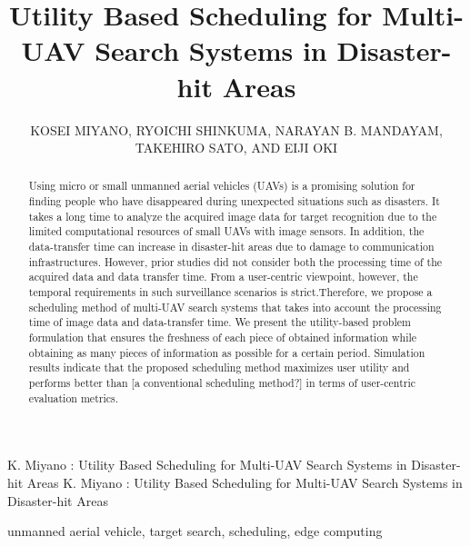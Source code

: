 \documentclass{ieeeaccess}
\begin{document}
\title{Utility Based Scheduling for Multi-UAV Search Systems in Disaster-hit Areas}

\author{\uppercase{Kosei MIYANO, Ryoichi SHINKUMA, NARAYAN B. MANDAYAM, Takehiro SATO, and Eiji OKI}}
\address[1]{Graduate School of Informatics, Kyoto University, Yoshida-honmachi, Sakyo-ku, Kyoto 606-8501, Japan}
\address[2]{Wireless Information Network Laboratory (WINLAB), Rutgers University, 671 Route 1 South, North Brunswick, NJ, 08902-3390, USA}

\markboth
{K. Miyano \headeretal: Utility Based Scheduling for Multi-UAV Search Systems in Disaster-hit Areas}
{K. Miyano \headeretal: Utility Based Scheduling for Multi-UAV Search Systems in Disaster-hit Areas}


\begin{IEEEkeywords}
unmanned aerial vehicle, target search, scheduling, edge computing
\end{IEEEkeywords}

\begin{abstract}
Using micro or small unmanned aerial vehicles (UAVs) is a promising solution for finding people who have disappeared during unexpected situations such as disasters.
 It takes a long time to analyze the acquired image data for target recognition due to the limited computational resources of small UAVs with image sensors.
In addition, the data-transfer time can increase in disaster-hit areas due to damage to communication infrastructures. However, prior studies did not consider both the processing time of the acquired data and data transfer time.  From a user-centric viewpoint, however, the temporal requirements in such surveillance scenarios is strict.Therefore, we propose a scheduling method of multi-UAV search systems that takes into account the processing time of image data and data-transfer time. We present the utility-based problem formulation that ensures the freshness of each piece of obtained information while obtaining as many pieces of information as possible for a certain period. Simulation results indicate that the proposed scheduling method maximizes user utility and performs better than [a conventional scheduling method?] in terms of user-centric evaluation metrics.

\end{abstract}
\end{document}
